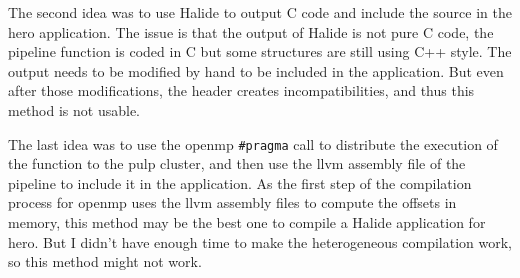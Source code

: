     The second idea was to use Halide to output C code and include the source in the \gls{hero} application. The issue is that the output of Halide is not pure C code, the pipeline function is coded in C but some structures are still using C++ style. The output needs to be modified by hand to be included in the application. But even after those modifications, the header creates incompatibilities, and thus this method is not usable.

    The last idea was to use the \gls{openmp} \texttt{\#pragma} call to distribute the execution of the function to the \gls{pulp} cluster, and then use the \gls{llvm} assembly file of the pipeline to include it in the application.
    As the first step of the compilation process for \gls{openmp} uses the \gls{llvm} assembly files to compute the offsets in memory, this method may be the best one to compile a Halide application for \gls{hero}.
    But I didn't have enough time to make the heterogeneous compilation work, so this method might not work.
\fi
